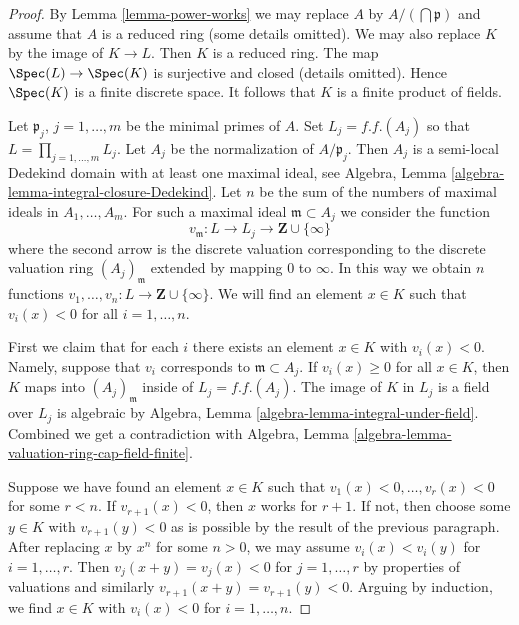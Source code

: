 \begin{proof}
By Lemma \ref{lemma-power-works} we may replace $A$ by
$A/(\bigcap \mathfrak p)$ and assume that $A$ is a reduced ring
(some details omitted).
We may also replace $K$ by the image of $K \to L$.
Then $K$ is a reduced ring. The map $\Spec(L) \to \Spec(K)$ is
surjective and closed (details omitted). Hence $\Spec(K)$ is a finite
discrete space. It follows that $K$ is a finite product of fields.

\medskip\noindent
Let $\mathfrak p_j$, $j = 1, \ldots, m$ be the minimal primes of $A$.
Set $L_j = f.f.(A_j)$ so that $L = \prod_{j = 1, \ldots, m} L_j$.
Let $A_j$ be the normalization of $A/\mathfrak p_j$. Then
$A_j$ is a semi-local Dedekind domain with at least
one maximal ideal, see
Algebra, Lemma \ref{algebra-lemma-integral-closure-Dedekind}.
Let $n$ be the sum of the numbers of maximal ideals
in $A_1, \ldots, A_m$. For such a maximal ideal $\mathfrak m \subset A_j$
we consider the function
$$
v_{\mathfrak m} : L \to L_j \to \mathbf{Z} \cup \{\infty\}
$$
where the second arrow is the discrete valuation corresponding
to the discrete valuation ring $(A_j)_{\mathfrak m}$ extended
by mapping $0$ to $\infty$. In this way we obtain $n$ functions
$v_1, \ldots, v_n : L \to \mathbf{Z} \cup \{\infty\}$.
We will find an element $x \in K$ such that $v_i(x) < 0$
for all $i = 1, \ldots, n$.

\medskip\noindent
First we claim that for each $i$ there exists an element $x \in K$
with $v_i(x) < 0$. Namely, suppose that $v_i$ corresponds to
$\mathfrak m \subset A_j$. If $v_i(x) \geq 0$ for all $x \in K$,
then $K$ maps into $(A_j)_{\mathfrak m}$ inside of $L_j = f.f.(A_j)$.
The image of $K$ in $L_j$ is a field over $L_j$ is
algebraic by Algebra, Lemma \ref{algebra-lemma-integral-under-field}.
Combined we get a contradiction with Algebra, Lemma
\ref{algebra-lemma-valuation-ring-cap-field-finite}.

\medskip\noindent
Suppose we have found an element $x \in K$ such that
$v_1(x) < 0, \ldots, v_r(x) < 0$ for some $r < n$. If $v_{r + 1}(x) < 0$,
then $x$ works for $r + 1$. If not, then choose some $y \in K$ with
$v_{r + 1}(y) < 0$ as is possible by the result of the previous
paragraph. After replacing $x$ by $x^n$ for some $n > 0$,
we may assume $v_i(x) < v_i(y)$ for $i = 1, \ldots, r$. Then
$v_j(x + y) = v_j(x) < 0$ for $j = 1, \ldots, r$ by properties
of valuations and similarly $v_{r + 1}(x + y) = v_{r + 1}(y) < 0$.
Arguing by induction, we find
$x \in K$ with $v_i(x) < 0$ for $i = 1, \ldots, n$.


\end{proof}
